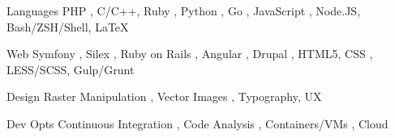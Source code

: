 


\begin{sectionKnowledge}

    \knowledgeEntry
        {Languages}
        {
            PHP , C/C++, Ruby , Python ,
            Go , JavaScript , Node.JS, Bash/ZSH/Shell, LaTeX
        }

    \knowledgeEntry
        {Web}
        {
            Symfony , Silex , Ruby on Rails ,
            Angular , Drupal , HTML5, CSS , LESS/SCSS, Gulp/Grunt
        }


    \knowledgeEntry
        {Design}
        {
            Raster Manipulation , Vector Images , Typography, UX
        }

    \knowledgeEntry
        {Dev Opts}
        {
            Continuous Integration , Code Analysis ,
            Containers/VMs , Cloud 
        }

\end{sectionKnowledge}

